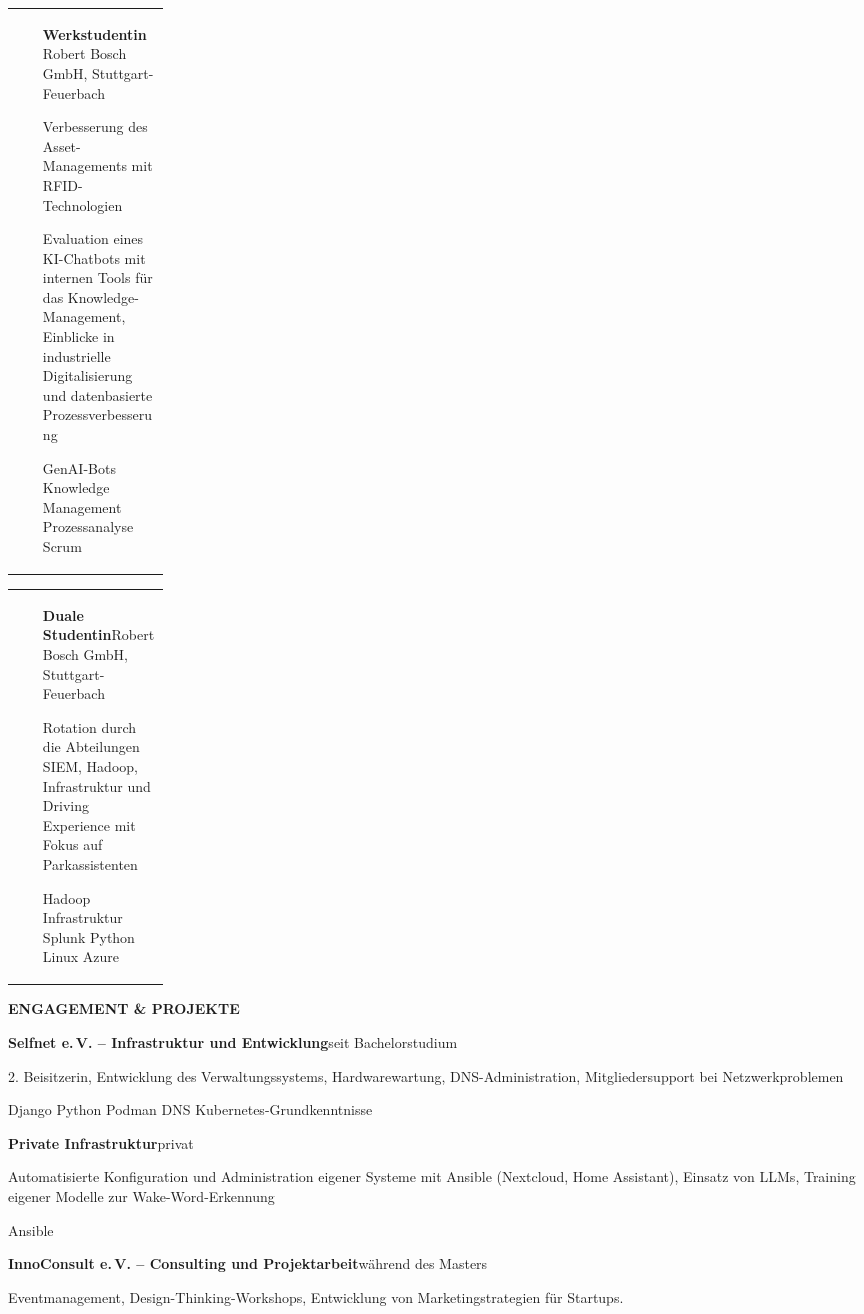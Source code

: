 \documentclass[10pt,a4paper]{article}
\makeatletter
\newcommand{\mainsection}[1]{%
  \vspace{2mm}%
  {\large\bfseries\textcolor{CVPrimary}{\MakeUppercase{#1}}}\par
  \vspace{0.8mm}{\color{CVRule}\rule{\linewidth}{0.6pt}}\vspace{1.2mm}
}
\newcommand{\entry}[4]{%
  \begin{tabularx}{\linewidth}{@{}>{\raggedright\arraybackslash}p{0.18\linewidth}@{\hspace{2.5mm}}X@{}}
    {\small\textcolor{CVMuted}{#1}} &
    {\bfseries #2}\hfill{\small\textcolor{CVMuted}{#3}}\par
    #4
  \end{tabularx}\vspace{1.2mm}
}
\newcommand{\compactentry}[3]{%
  {\bfseries #1}\hfill{\small\textcolor{CVMuted}{#2}}\par
  #3\par\vspace{1.7mm}
}
\newcommand{\tag}[1]{%
  \begingroup
  \setlength{\fboxsep}{1.4pt}%
  \colorbox{CVSoft}{\scriptsize\textcolor{CVPrimary}{#1}}%
  \endgroup\hspace{0.7mm}%
}
\makeatother
\begin{document}
\begin{minipage}[t]{0.705\textwidth}
  \entry{10/2024--03/2025}{Werkstudentin}{Robert Bosch GmbH, Stuttgart-Feuerbach}{
    Verbesserung des Asset-Managements mit RFID-Technologien\par Evaluation eines
    KI-Chatbots mit internen Tools für das Knowledge-Management, Einblicke in
    industrielle Digitalisierung und datenbasierte Prozessverbesserung\par
    \tag{GenAI-Bots}\tag{Knowledge Management}\tag{Prozessanalyse}\tag{Scrum}
  }

  \entry{10/2021--09/2024}{Duale Studentin}{Robert Bosch GmbH, Stuttgart-Feuerbach}{
    Rotation durch die Abteilungen SIEM, Hadoop, Infrastruktur und Driving Experience mit Fokus auf
    Parkassistenten\par
    \tag{Hadoop}\tag{Infrastruktur}\tag{Splunk}\tag{Python}\tag{Linux}\tag{Azure}
  }

  \mainsection{Engagement \& Projekte}

  \compactentry{Selfnet e.\,V. -- Infrastruktur und Entwicklung}{seit Bachelorstudium}{
    2. Beisitzerin, Entwicklung des Verwaltungssystems, Hardwarewartung,
    DNS-Administration, Mitgliedersupport bei Netzwerkproblemen\par
    \tag{Django}\tag{Python}\tag{Podman}\tag{DNS}\tag{Kubernetes-Grundkenntnisse}
  }

  \compactentry{Private Infrastruktur}{privat}{
    Automatisierte Konfiguration und Administration eigener Systeme mit Ansible
    (Nextcloud, Home Assistant), Einsatz von LLMs, Training eigener
    Modelle zur Wake-Word-Erkennung\par
    \tag{Ansible}
  }

  \compactentry{InnoConsult e.\,V. -- Consulting und Projektarbeit}{während des Masters}{
    Eventmanagement, Design-Thinking-Workshops, Entwicklung von Marketingstrategien für Startups.
  }
\end{minipage}
\end{document}
